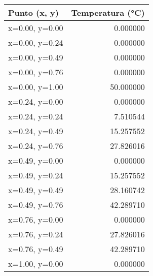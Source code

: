 \begin{tabular}{lr}
\toprule
Punto (x, y) & Temperatura (°C) \\
\midrule
x=0.00, y=0.00 & 0.000000 \\
x=0.00, y=0.24 & 0.000000 \\
x=0.00, y=0.49 & 0.000000 \\
x=0.00, y=0.76 & 0.000000 \\
x=0.00, y=1.00 & 50.000000 \\
x=0.24, y=0.00 & 0.000000 \\
x=0.24, y=0.24 & 7.510544 \\
x=0.24, y=0.49 & 15.257552 \\
x=0.24, y=0.76 & 27.826016 \\
x=0.49, y=0.00 & 0.000000 \\
x=0.49, y=0.24 & 15.257552 \\
x=0.49, y=0.49 & 28.160742 \\
x=0.49, y=0.76 & 42.289710 \\
x=0.76, y=0.00 & 0.000000 \\
x=0.76, y=0.24 & 27.826016 \\
x=0.76, y=0.49 & 42.289710 \\
x=1.00, y=0.00 & 0.000000 \\
\bottomrule
\end{tabular}
